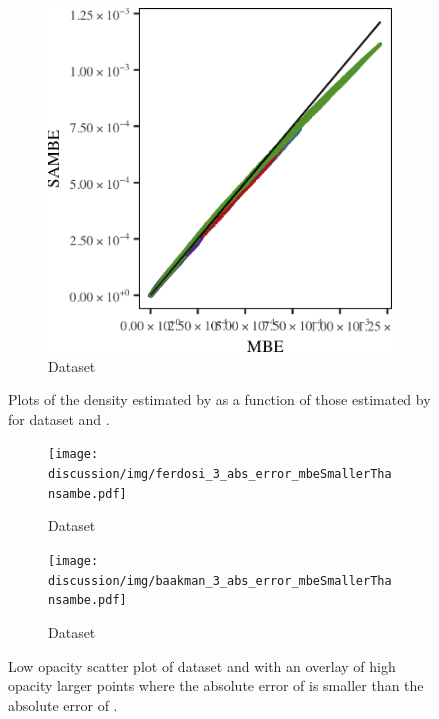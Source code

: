 \begin{figure}
\begin{subfigure}{0.23\textwidth}
			\includegraphics[keepaspectratio=true, width=\textwidth, height=0.23\textheight]{discussion/img/baakman_3_120000_mbe_sambe.png}
			\caption{Dataset \baakmanThree}
			\label{fig:discussion:multisphere:mbevssambe:baakman3}
		\end{subfigure}	
		\caption{Plots of the density estimated by \sambe as a function of those estimated by \mbe for dataset %
			\ferdosiTwo and %
			\baakmanTwo.
		}
		\label{fig:discussion:multisphere:four:mbevssambe}
	\end{figure}

	\begin{figure}
		\centering
		\begin{subfigure}{0.23\textwidth}
			\centering
			\texttt{[image: discussion/img/ferdosi\_3\_abs\_error\_mbeSmallerThansambe.pdf]}
			\caption{Dataset \ferdosiThree}
			\label{fig:discussion:multisphere:mbeLowerError:ferdosi3}
		\end{subfigure}
		\begin{subfigure}{0.23\textwidth}
			\centering
			\texttt{[image: discussion/img/baakman\_3\_abs\_error\_mbeSmallerThansambe.pdf]}
			\caption{Dataset \baakmanThree}
			\label{fig:discussion:multisphere:mbeLowerError:baakman3}
		\end{subfigure}	
		\caption{Low opacity scatter plot of dataset 			 %
			\ferdosiTwo and  \baakmanTwo with an overlay of high opacity larger points where the absolute error of \mbe is smaller than the absolute error of \sambe.
		}
		\label{fig:discussion:multisphere:four:mbeLowerError}
	\end{figure}	